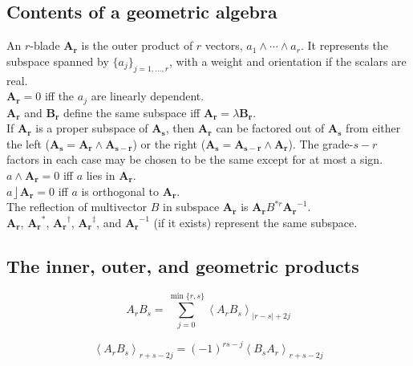 \documentclass{utarticle}
\newcommand{\bl}[1]{\ensuremath{\bm{#1}}}
\DeclareMathOperator{\lin}{\rfloor}
\DeclareMathOperator{\out}{\wedge}
\newcommand{\grinv}[2][]{\ensuremath{#2^{*#1}}}
\newcommand{\rev}[1]{\ensuremath{#1^\dagger}}
\newcommand{\clifconj}[1]{\ensuremath{#1^\ddagger}}
\newcommand{\grade}[2][]{\ensuremath{\left\langle #2 \right\rangle_{#1}}}
\begin{document}
\subsection{Contents of a geometric algebra}
\label{app:contents}

An $r$-blade \bl{A_r} is the outer product of $r$ vectors, $a_1 \out \dotsb \out a_r$.
It represents the subspace spanned by $\{a_j\}_{j=1,\dotsc,r}$, with a weight and orientation
if the scalars are real. \\

\noindent $\bl{A_r} = 0$ iff the $a_j$ are linearly dependent. \\

\noindent \bl{A_r} and \bl{B_r} define the same subspace iff $\bl{A_r} = \lambda \bl{B_r}$. \\ 

\noindent If \bl{A_r} is a proper subspace of \bl{A_s}, then \bl{A_r} can be factored out of 
\bl{A_s} from either the left ($\bl{A_s} = \bl{A_r} \out \bl{A_{s-r}}$) or the right ($\bl{A_s} = 
\bl{A_{s-r}} \out \bl{A_r}$). The grade-$s-r$ factors in each case may be chosen to be the 
same except for at most a sign. \\

\noindent $a \out \bl{A_r} = 0$ iff $a$ lies in \bl{A_r}. \\

\noindent $a \lin \bl{A_r} = 0$ iff $a$ is orthogonal to \bl{A_r}. \\

\noindent The reflection of multivector $B$ in subspace \bl{A_r} is $\bl{A_r} \grinv[r]{B} \bl{A_r}^{-1}$. \\

\noindent \bl{A_r}, \grinv{\bl{A_r}}, \rev{\bl{A_r}}, \clifconj{\bl{A_r}}, and $\bl{A_r}^{-1}$ 
(if it exists) represent the same subspace.

\subsection{The inner, outer, and geometric products}
\label{app:inoutgeom}

\begin{equation} 
A_r B_s = \sum_{j=0}^{\min\{r,s\}} \grade[|r-s|+2j]{A_r B_s}
\end{equation}

\begin{equation} 
\grade[r+s-2j]{A_r B_s} = (-1)^{rs-j} \grade[r+s-2j]{B_s A_r}
\end{equation}
\end{document}
